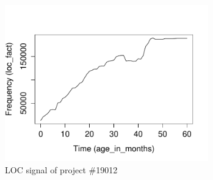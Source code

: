 \begin{figure}[H]
\caption{LOC signal of project \#19012}\label{figure:signal}
\centering
	\includegraphics[height=192pt]{images/signal_pid_19012.pdf}
\end{figure}